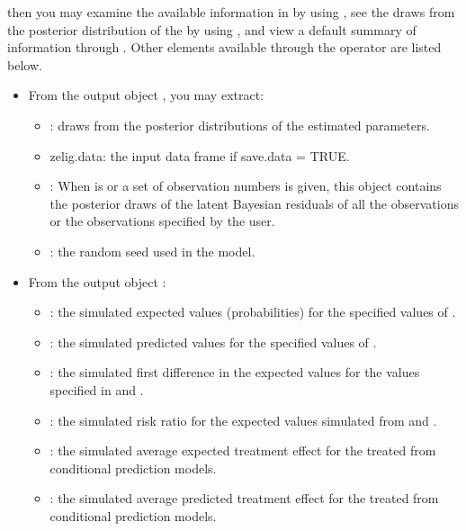 \documentclass[letterpaper,10pt,english]{sphinxmanual}
\begin{document}
then you may examine the available information in  by using
, see the draws from the posterior distribution of the
 by using , and view a default
summary of information through . Other elements
available through the \code{\$} operator are listed below.
\begin{itemize}
\item {} 
From the  output object , you may extract:
\begin{itemize}
\item {} 
: draws from the posterior distributions of the
estimated parameters.

\item {} 
zelig.data: the input data frame if save.data = TRUE.

\item {} 
: When  is  or a set
of observation numbers is given, this object contains the
posterior draws of the latent Bayesian residuals of all the
observations or the observations specified by the user.

\item {} 
: the random seed used in the model.

\end{itemize}

\item {} 
From the  output object :
\begin{itemize}
\item {} 
: the simulated expected values (probabilities) for the
specified values of .

\item {} 
: the simulated predicted values for the specified values
of .

\item {} 
: the simulated first difference in the expected values
for the values specified in  and .

\item {} 
: the simulated risk ratio for the expected values
simulated from  and .

\item {} 
: the simulated average expected treatment effect for
the treated from conditional prediction models.

\item {} 
: the simulated average predicted treatment effect
for the treated from conditional prediction models.

\end{itemize}

\end{itemize}
\end{document}
